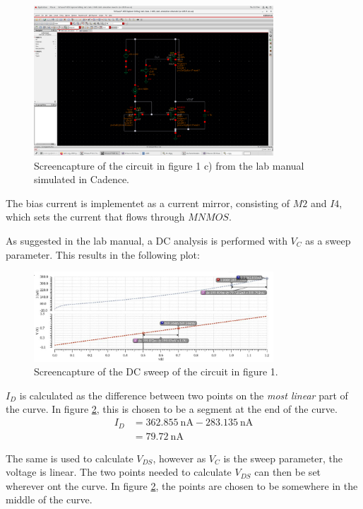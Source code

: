\documentclass[onecolumn]{article}
\begin{document}
\begin{figure}[h!]
    \centering
    \includegraphics[width=0.8\textwidth]{c).png}
    \caption{Screencapture of the circuit in figure 1 c) from the lab manual simulated in Cadence.}
    \label{fig:circuitc}
\end{figure}

The bias current is implementet as a current mirror, consisting of $M2$ and $I4$, which sets the current that flows through $MNMOS$.

As suggested in the lab manual, a DC analysis is performed with $V_C$ as a sweep parameter. This results in the following plot:

\begin{figure}[h!]
    \centering
    \includegraphics[width=0.8\textwidth]{plot_dc_sweep_c.jpg}
    \caption{Screencapture of the DC sweep of the circuit in figure 1.}
    \label{fig:plotc}
\end{figure}

$I_D$ is calculated as the difference between two points on the \textit{most linear} part of the curve. In figure \ref{fig:plotc}, this is chosen to be a segment at the end of the curve. 
\begin{align}
    I_D &= 362.855 \ \text{nA} - 283.135 \ \text{nA} \nonumber \\
        &= 79.72 \ \text{nA} \nonumber 
\end{align}

The same is used to calculate $V_{DS}$, however as $V_C$ is the sweep parameter, the voltage is linear. The two points needed to calculate $V_{DS}$ can then be set wherever ont the curve. In figure \ref{fig:plotc}, the points are chosen to be somewhere in the middle of the curve.
\end{document}
